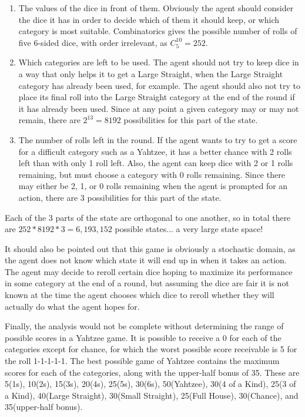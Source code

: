 \documentclass{article}
\begin{document}
\begin{enumerate}
\item{}
The values of the dice in front of them. Obviously the agent should consider
the dice it has in order to decide which of them it should keep, or which
category is most suitable. Combinatorics gives the possible number of
rolls of five 6-sided dice, with order irrelevant, as $C^{10}_5=252$.

\item{}
Which categories are left to be used. The agent should not try to keep
dice in a way that only helps it to get a Large Straight, when the Large
Straight category has already
been used, for example. The agent should also not try to place its final roll
into the Large Straight category at the end of the round if it has already been
used. Since at any point a given category may or may not remain, there are
$2^{13} = 8192$ possibilities for this part of the state.

\item{}
The number of rolls left in the round. If the agent wants to try to get a score
for a difficult category such as a Yahtzee, it has a better chance with 2 rolls
left than with only 1 roll left. Also, the agent can keep dice with 2 or 1 rolls
remaining, but must choose a category with 0 rolls remaining. Since there may
either be 2, 1, or 0 rolls remaining when the agent is prompted for an action,
there are 3 possibilities for this part of the state.

\end{enumerate}

Each of the 3 parts of the state are orthogonal to one another, so in total 
there are $252*8192*3 = 6,193,152$ possible states... a very large state space!

\vspace{1em}

It should also be pointed out that this game is obviously a stochastic domain,
as the agent does not know which state it will end up in when it takes an
action. The agent may decide to reroll certain dice hoping to maximize its
performance in
some category at the end of a round, but assuming the dice are fair it is not
known at the time the agent chooses which dice to reroll whether they will
actually do what the agent hopes for.

\vspace{1em}

Finally, the analysis would not be complete without determining the range of
possible scores in a Yahtzee game. It is possible to receive a 0 for each of the
categories except for chance, for which the worst possible score receivable is
5 for the roll 1-1-1-1-1. The best possible game of Yahtzee contains the
maximum scores for each of the categories, along with the upper-half bonus of
35. These are 5(1s), 10(2s), 15(3s), 20(4s), 25(5s), 30(6s), 50(Yahtzee),
30(4 of a Kind), 25(3 of a Kind), 40(Large Straight), 30(Small Straight),
25(Full House), 30(Chance), and 35(upper-half bonus).
\end{document}
